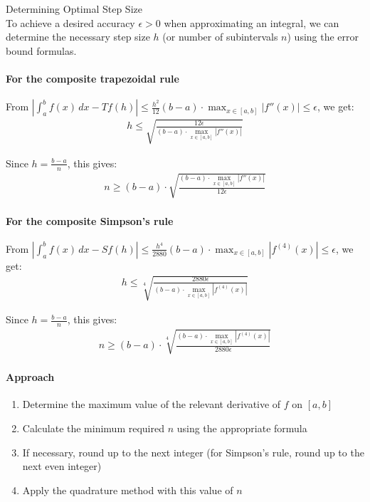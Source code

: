 \begin{KR}{Determining Optimal Step Size}\\
To achieve a desired accuracy $\epsilon > 0$ when approximating an integral, we can determine the necessary step size $h$ (or number of subintervals $n$) using the error bound formulas.

\paragraph{For the composite trapezoidal rule}
From $\left|\int_a^b f(x) \, dx - Tf(h)\right| \leq \frac{h^2}{12}(b-a) \cdot \max_{x\in[a,b]}|f''(x)| \leq \epsilon$,
we get:
\begin{align*}
h \leq \sqrt{\frac{12\epsilon}{(b-a) \cdot \max_{x\in[a,b]}|f''(x)|}}
\end{align*}

Since $h = \frac{b-a}{n}$, this gives:
\begin{align*}
n \geq (b-a) \cdot \sqrt{\frac{(b-a) \cdot \max_{x\in[a,b]}|f''(x)|}{12\epsilon}}
\end{align*}

\paragraph{For the composite Simpson's rule}
From $\left|\int_a^b f(x) \, dx - Sf(h)\right| \leq \frac{h^4}{2880}(b-a) \cdot \max_{x\in[a,b]}|f^{(4)}(x)| \leq \epsilon$,
we get:
\begin{align*}
h \leq \sqrt[4]{\frac{2880\epsilon}{(b-a) \cdot \max_{x\in[a,b]}|f^{(4)}(x)|}}
\end{align*}

Since $h = \frac{b-a}{n}$, this gives:
\begin{align*}
n \geq (b-a) \cdot \sqrt[4]{\frac{(b-a) \cdot \max_{x\in[a,b]}|f^{(4)}(x)|}{2880\epsilon}}
\end{align*}

\paragraph{Approach}
\begin{enumerate}
    \item Determine the maximum value of the relevant derivative of $f$ on $[a,b]$
    \item Calculate the minimum required $n$ using the appropriate formula
    \item If necessary, round up to the next integer (for Simpson's rule, round up to the next even integer)
    \item Apply the quadrature method with this value of $n$
\end{enumerate}
\end{KR}

